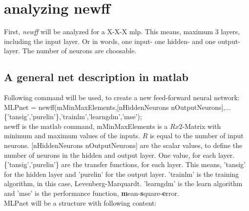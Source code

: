 \section{analyzing newff}
First, \textit{newff} will be analyzed for a X-X-X mlp. This means, maximum 3 layers, including the input layer. Or in words, one input- one hidden- and one output-layer. The number of neurons are choosable.

\subsection{A general net description in matlab}
Following command will be used, to create a new feed-forward neural network:\\
\noindent MLPnet = newff(mMinMaxElements,[nHiddenNeurons nOutputNeurons],...\newline
\{'tansig','purelin'\},'trainlm','learngdm','mse');\\

newff is the matlab command, mMinMaxElements is a $Rx2$-Matrix with minimum and maximum values of the inputs. $R$ is equal to the number of input neurons. [nHiddenNeurons nOutputNeurons] are the scalar values, to define the number of neurons in the hidden and output layer. One value, for each layer. \{'tansig','purelin'\} are the transfer functions, for each layer. This means, 'tansig' for the hidden layer and 'purelin' for the output layer. 'trainlm' is the training algorithm, in this case, Levenberg-Marquardt. 'learngdm' is the learn algorithm and 'mse' is the performance function, \textbf{m}ean-\textbf{s}quare-\textbf{e}rror.\\
MLPnet will be a structure with following content:

